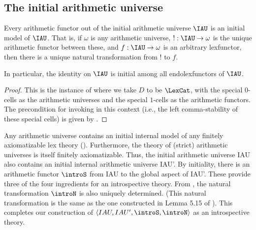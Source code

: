 \TODO

\subsection{The initial arithmetic universe}
\begin{theorem}\label{AUStrongSigma1esque}
Every arithmetic functor out of the initial arithmetic universe $\IAU$ is an initial model of $\IAU$. That is, if $\omega$ is any arithmetic universe, $! : \IAU \to \omega$ is the unique arithmetic functor between these, and $f: \IAU \to \omega$ is an arbitrary lexfunctor, then there is a unique natural transformation from $!$ to $f$.

In particular, the identity on $\IAU$ is initial among all endolexfunctors of $\IAU$.
\end{theorem}
\begin{proof}
This is the instance of  where we take $D$ to be $\LexCat$, with the special $0$-cells as the arithmetic universes and the special $1$-cells as the arithmetic functors. The precondition for invoking  in this context (i.e., the left comma-stability of these special cells) is given by .
\end{proof}

\begin{construction}\label{IAUAsIntrosp}
Any arithmetic universe contains an initial internal model of any finitely axiomatizable lex theory (). Furthermore, the theory of (strict) arithmetic universes is itself finitely axiomatizable. Thus, the initial arithmetic universe IAU also contains an initial internal arithmetic universe IAU'. By initiality, there is an arithmetic functor $\introS$ from IAU to the global aspect of IAU'. These provide three of the four ingredients for an introspective theory. From , the natural transformation $\introN$ is also uniquely determined. (This natural transformation is the same as the one constructed in Lemma 5.15 of \autocite{van2020g}). This completes our construction of $\langle IAU, IAU', \introS, \introN \rangle$ as an introspective theory.
\end{construction}


